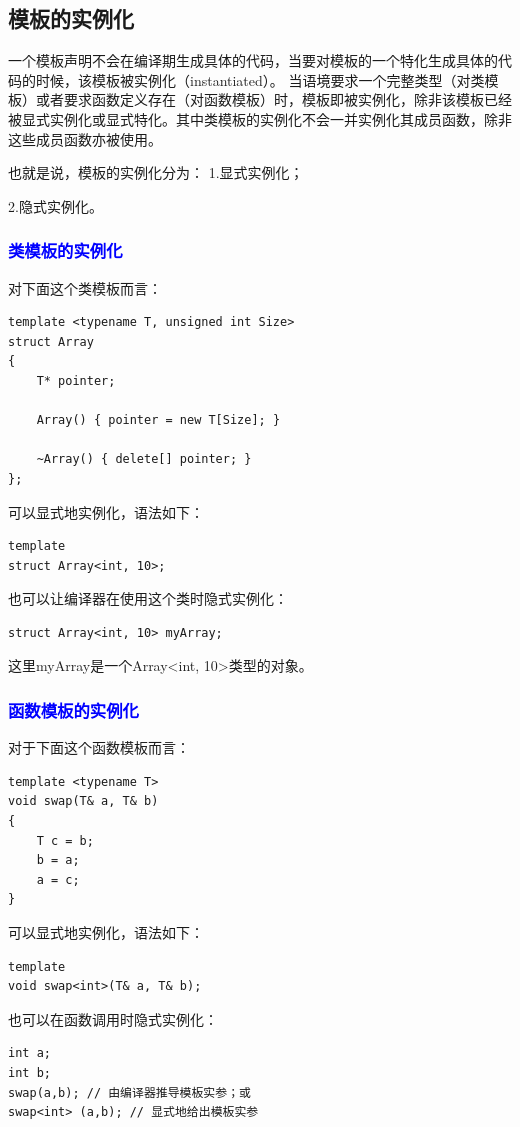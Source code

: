 \documentclass[UTF8]{ctexart}
\begin{document}
\subsection{模板的实例化}
一个模板声明不会在编译期生成具体的代码，当要对模板的一个特化生成具体的代码的时候，该模板被实例化（instantiated）。 当语境要求一个完整类型（对类模板）或者要求函数定义存在（对函数模板）时，模板即被实例化，除非该模板已经被显式实例化或显式特化。其中类模板的实例化不会一并实例化其成员函数，除非这些成员函数亦被使用。

也就是说，模板的实例化分为：
1.显式实例化；

2.隐式实例化。
\subsubsection{\textcolor{blue}{类模板的实例化}}
对下面这个类模板而言：
\begin{lstlisting}
template <typename T, unsigned int Size>
struct Array
{
    T* pointer;

    Array() { pointer = new T[Size]; } 
    
    ~Array() { delete[] pointer; }
};
\end{lstlisting}

可以显式地实例化，语法如下：
\begin{lstlisting}
template 
struct Array<int, 10>;
\end{lstlisting}

也可以让编译器在使用这个类时隐式实例化：
\begin{lstlisting}
struct Array<int, 10> myArray;
\end{lstlisting}

这里myArray是一个Array<int, 10>类型的对象。
\subsubsection{\textcolor{blue}{函数模板的实例化}}
对于下面这个函数模板而言：
\begin{lstlisting}
template <typename T>
void swap(T& a, T& b) 
{
    T c = b;
    b = a;
    a = c;
}
\end{lstlisting}

可以显式地实例化，语法如下：
\begin{lstlisting}
template 
void swap<int>(T& a, T& b);
\end{lstlisting}

也可以在函数调用时隐式实例化：
\begin{lstlisting}
int a;
int b;
swap(a,b); // 由编译器推导模板实参；或
swap<int> (a,b); // 显式地给出模板实参
\end{lstlisting}
\end{document}
